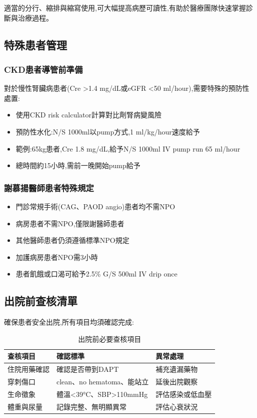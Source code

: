 \documentclass[12pt,a4paper]{article}
\newcommand{\note}[1]{
    \par
    \noindent
    \begin{tcolorbox}[
        colback=emergency_blue!5!white,
        colframe=emergency_blue,
        title=\textbf{重點提醒},
        fonttitle=\bfseries,
        boxrule=0.5pt,
        arc=3pt,
        left=6pt,
        right=6pt,
        top=6pt,
        bottom=6pt
    ]
    #1
    \end{tcolorbox}
}
\begin{document}
\note{
適當的分行、縮排與縮寫使用,可大幅提高病歷可讀性,有助於醫療團隊快速掌握診斷與治療過程。
}

\subsection{特殊患者管理}
\subsubsection{CKD患者導管前準備}
對於慢性腎臟病患者(Cre >1.4 mg/dL或eGFR <50 ml/hour),需要特殊的預防性處置:

\begin{itemize}[nosep]
    \item 使用CKD risk calculator計算對比劑腎病變風險
    \item 預防性水化:N/S 1000ml以pump方式,1 ml/kg/hour速度給予
    \item 範例:65kg患者,Cre 1.8 mg/dL,給予N/S 1000ml IV pump run 65 ml/hour
    \item 總時間約15小時,需前一晚開始pump給予
\end{itemize}

\subsubsection{謝慕揚醫師患者特殊規定}
\begin{itemize}[nosep]
    \item 門診常規手術(CAG、PAOD angio)患者均不需NPO
    \item 病房患者不需NPO,僅限謝醫師患者
    \item 其他醫師患者仍須遵循標準NPO規定
    \item 加護病房患者NPO需3小時
    \item 患者飢餓或口渴可給予2.5\% G/S 500ml IV drip once
\end{itemize}

\subsection{出院前查核清單}
確保患者安全出院,所有項目均須確認完成:

\begin{table}[h]
    \centering
    \caption{出院前必要查核項目}
    \begin{tabular}{p{4cm} p{8cm} p{4cm}}
        \toprule
        \textbf{查核項目} & \textbf{確認標準} & \textbf{異常處理} \\
        \midrule
        住院用藥確認 & 確認是否帶到DAPT & 補充遺漏藥物 \\
        穿刺傷口 & clean、no hematoma、能站立 & 延後出院觀察 \\
        生命徵象 & 體溫<39°C、SBP>110mmHg & 評估感染或低血壓 \\
        體重與尿量 & 記錄完整、無明顯異常 & 評估心衰狀況 \\
        \bottomrule
    \end{tabular}
\end{table}
\end{document}
